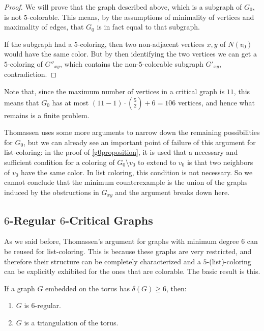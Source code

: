 \begin{proof}
We will prove that the graph described above, which is a subgraph of $G_0$, is not $5$-colorable. 
This means, by the assumptions of minimality of vertices and maximality of edges, that $G_0$ is
in fact equal to that subgraph. 

If the subgraph had a $5$-coloring, then two non-adjacent vertices $x, y$ of $N(v_0)$ would 
have the same color. But by then identifying the two vertices we can get a $5$-coloring 
of $G''_{xy}$, which contains the non-$5$-colorable subgraph $G'_{xy}$, contradiction.

\end{proof}

Note that, since the maximum number of vertices in a critical graph is $11$, this means that
$G_0$ has at most $(11 - 1) \cdot \binom{5}{2} + 6 = 106$ vertices, and hence what remains
is a finite problem.

Thomassen uses some more arguments to narrow down the remaining possibilities for $G_0$, but
we can already see an important point of failure of this argument for list-coloring: in the 
proof of \ref{g0proposition}, it is used that a necessary and sufficient condition for a coloring
of $G_0 \setminus v_0$ to extend to $v_0$ is that two neighbors of $v_0$ have the same color.
In list coloring, this condition is not necessary. So we cannot conclude that the minimum 
counterexample is the union of the graphs induced by the obstructions in $G_{xy}$ and the 
argument breaks down here. 



\subsection{$6$-Regular $6$-Critical Graphs}

As we said before, Thomassen's argument for graphs with minimum degree $6$ can be reused for list-coloring. This is because these graphs are very restricted, and therefore their structure can be completely characterized and a $5$-(list)-coloring can be explicitly exhibited for the ones that are colorable. The basic result is this.

\begin{proposition}
If a graph $G$ embedded on the torus has $\delta(G) \geq 6$, then:

\begin{enumerate}
	\item $G$ is $6$-regular.
	\item $G$ is a triangulation of the torus.
\end{enumerate}
\end{proposition}

